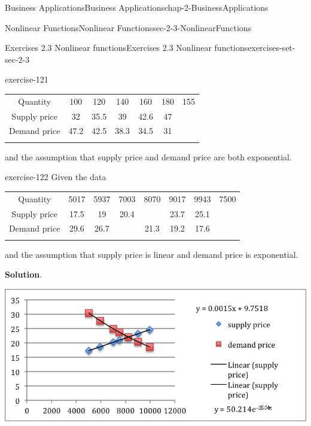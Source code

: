 \documentclass[oneside,10pt,]{book}
\numberwithin{equation}{section}
\newcommand{\hrulethin}  {\noalign{\hrule height 0.04em}}
\newcommand{\hrulemedium}{\noalign{\hrule height 0.07em}}
\newcommand{\hrulethick} {\noalign{\hrule height 0.11em}}
\begin{document}
\begin{chapterptx}{Business Applications}{}{Business Applications}{}{}{chap-2-BusinessApplications}
\begin{sectionptx}{Nonlinear Functions}{}{Nonlinear Functions}{}{}{sec-2-3-NonlinearFunctions}
\begin{exercises-subsection-numberless}{Exercises 2.3 Nonlinear functions}{}{Exercises 2.3 Nonlinear functions}{}{}{exercises-set-sec-2-3}
\begin{exercisegroup}
\begin{divisionexerciseeg}{6}{}{}{exercise-121}
\begin{sidebyside}{1}{0}{0}{0}
\begin{sbspanel}{1}%
{\centering%
\begin{tabular}{ccccccc}\hrulethick
Quantity&100&120&140&160&180&155\tabularnewline\hrulethin
Supply price&32&35.5&39&42.6&47&\tabularnewline\hrulemedium
Demand price&47.2&42.5&38.3&34.5&31&\tabularnewline\hrulemedium
\end{tabular}
\par}
\end{sbspanel}%
\end{sidebyside}%
\par
\hypertarget{p-828}{}%
and the assumption that supply price and demand price are both exponential.%
\end{divisionexerciseeg}%
\begin{divisionexerciseeg}{7}{}{}{exercise-122}%
\hypertarget{p-829}{}%
Given the data%
\begin{sidebyside}{1}{0}{0}{0}%
\begin{sbspanel}{1}%
{\centering%
\begin{tabular}{cccccccc}\hrulethick
Quantity&5017&5937&7003&8070&9017&9943&7500\tabularnewline\hrulethin
Supply price&17.5&19&20.4&&23.7&25.1&\tabularnewline\hrulemedium
Demand price&29.6&26.7&&21.3&19.2&17.6&\tabularnewline\hrulemedium
\end{tabular}
\par}
\end{sbspanel}%
\end{sidebyside}%
\par
\hypertarget{p-830}{}%
and the assumption that supply price is linear and demand price is exponential.%
\par\smallskip%
\noindent\textbf{Solution}.\hypertarget{solution-59}{}\quad%
\leavevmode%
\begin{sidebyside}{1}{0.1}{0.1}{0}%
\begin{sbspanel}{0.8}%
\includegraphics[width=1\linewidth]{images/sec2-3-sol7a.png}
\end{sbspanel}%

\end{sidebyside}
\end{divisionexerciseeg}
\end{exercisegroup}
\end{exercises-subsection-numberless}
\end{sectionptx}
\end{chapterptx}
\end{document}
